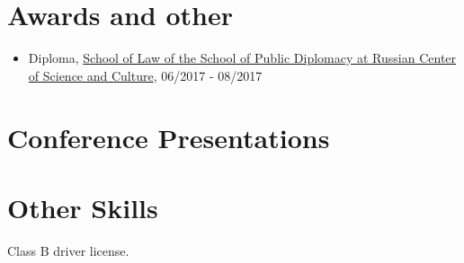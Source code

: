 \documentclass{article}
\begin{document}
 
\section{Awards and other}
\begin{itemize}
\item Diploma, \href{http://www.schoolofpublicdiplomacy.com/}{School of Law of the School of Public Diplomacy at Russian Center of Science and Culture},  06/2017 - 08/2017 
\end{itemize}
 
\section{Conference Presentations }
 
 
\section{Other Skills}
\begin{description}[widest=Langauges]
\item[Other]  Class B driver license.
\end{description}
\end{document}
